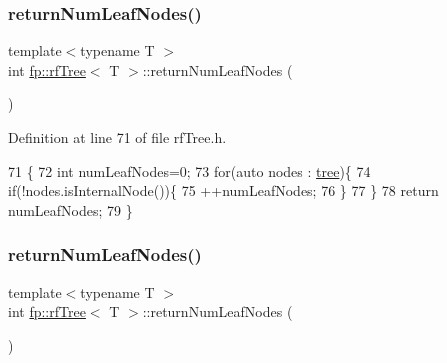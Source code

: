 \subsubsection{\texorpdfstring{return\+Num\+Leaf\+Nodes()}{returnNumLeafNodes()}\hspace{0.1cm}{\footnotesize\ttfamily [1/2]}}
{\footnotesize\ttfamily template$<$typename T $>$ \\
int \hyperlink{classfp_1_1rfTree}{fp\+::rf\+Tree}$<$ T $>$\+::return\+Num\+Leaf\+Nodes (\begin{DoxyParamCaption}{ }\end{DoxyParamCaption})\hspace{0.3cm}{\ttfamily [inline]}}



Definition at line 71 of file rf\+Tree.\+h.


\begin{DoxyCode}
71                                                \{
72                     \textcolor{keywordtype}{int} numLeafNodes=0;
73                     \textcolor{keywordflow}{for}(\textcolor{keyword}{auto} nodes : \hyperlink{classtree}{tree})\{
74                         \textcolor{keywordflow}{if}(!nodes.isInternalNode())\{
75                             ++numLeafNodes;
76                         \}
77                     \}
78                     \textcolor{keywordflow}{return} numLeafNodes;
79                 \}
\end{DoxyCode}
\mbox{\label{classfp_1_1rfTree_a6474edd1b84d70be1712326f9a845139}} 
\subsubsection{\texorpdfstring{return\+Num\+Leaf\+Nodes()}{returnNumLeafNodes()}\hspace{0.1cm}{\footnotesize\ttfamily [2/2]}}
{\footnotesize\ttfamily template$<$typename T $>$ \\
int \hyperlink{classfp_1_1rfTree}{fp\+::rf\+Tree}$<$ T $>$\+::return\+Num\+Leaf\+Nodes (\begin{DoxyParamCaption}{ }\end{DoxyParamCaption})\hspace{0.3cm}{\ttfamily [inline]}}



